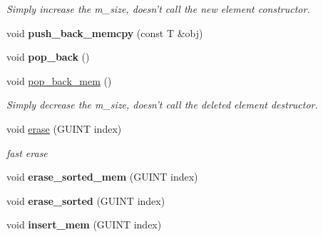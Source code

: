 \begin{DoxyCompactItemize}
\begin{DoxyCompactList}\small\item\em Simply increase the m\+\_\+size, doesn't call the new element constructor. \end{DoxyCompactList}\item 
\hypertarget{classgim__array_a8ef553253e1a77ed4f3168ca2e4da225}{void {\bfseries push\+\_\+back\+\_\+memcpy} (const T \&obj)}\label{classgim__array_a8ef553253e1a77ed4f3168ca2e4da225}

\item 
\hypertarget{classgim__array_aeebbf5deb27265451bf00db5ce57c5fc}{void {\bfseries pop\+\_\+back} ()}\label{classgim__array_aeebbf5deb27265451bf00db5ce57c5fc}

\item 
\hypertarget{classgim__array_aa15906909f6f824e559864359096db63}{void \hyperlink{classgim__array_aa15906909f6f824e559864359096db63}{pop\+\_\+back\+\_\+mem} ()}\label{classgim__array_aa15906909f6f824e559864359096db63}

\begin{DoxyCompactList}\small\item\em Simply decrease the m\+\_\+size, doesn't call the deleted element destructor. \end{DoxyCompactList}\item 
\hypertarget{classgim__array_a0de98d5b161c18568c7bc3a13e90df51}{void \hyperlink{classgim__array_a0de98d5b161c18568c7bc3a13e90df51}{erase} (G\+U\+I\+N\+T index)}\label{classgim__array_a0de98d5b161c18568c7bc3a13e90df51}

\begin{DoxyCompactList}\small\item\em fast erase \end{DoxyCompactList}\item 
\hypertarget{classgim__array_a878dddc1e188bfdbd738ec925f4386cf}{void {\bfseries erase\+\_\+sorted\+\_\+mem} (G\+U\+I\+N\+T index)}\label{classgim__array_a878dddc1e188bfdbd738ec925f4386cf}

\item 
\hypertarget{classgim__array_a992f8d76ef464690cd11a4ffc3d5ac2d}{void {\bfseries erase\+\_\+sorted} (G\+U\+I\+N\+T index)}\label{classgim__array_a992f8d76ef464690cd11a4ffc3d5ac2d}

\item 
\hypertarget{classgim__array_ad136c0af14df7e2943e437be26edda29}{void {\bfseries insert\+\_\+mem} (G\+U\+I\+N\+T index)}\label{classgim__array_ad136c0af14df7e2943e437be26edda29}


\end{DoxyCompactItemize}
